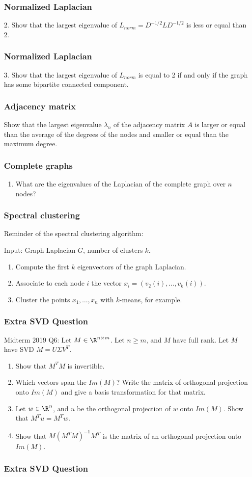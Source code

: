 \documentclass{beamer}
\begin{document}
\begin{frame}[t]
\frametitle{Normalized Laplacian}
2. Show that the largest eigenvalue of $L_{norm} = D^{-1/2} L D^{-1/2}$ is less or equal than 2.
\pause
\end{frame}

\begin{frame}[t]
\frametitle{Normalized Laplacian}
3. Show that the largest eigenvalue of $L_{norm}$ is equal to 2 if and only if the graph has some bipartite connected component.
\pause
\end{frame}

\begin{frame}[t]
\frametitle{Adjacency matrix}
Show that the largest eigenvalue $\lambda_n$ of the adjacency matrix $A$ is larger or equal than the average of the degrees of the nodes and smaller or equal than the maximum degree. 
\pause
\end{frame}

\begin{frame}[t]
\frametitle{Complete graphs}
\begin{enumerate}
\item What are the eigenvalues of the Laplacian of the complete graph over $n$ nodes?
\end{enumerate}
\pause
\end{frame}

\begin{frame}[t]
\frametitle{Spectral clustering}
Reminder of the spectral clustering algorithm:

Input: Graph Laplacian $G$, number of clusters $k$.
\begin{enumerate}
\item Compute the first $k$ eigenvectors of the graph Laplacian.
\item Associate to each node $i$ the vector $x_i = (v_2(i), \dots, v_k(i))$.
\item Cluster the points $x_1, \dots, x_n$ with $k$-means, for example.
\end{enumerate}
\end{frame}

\begin{frame}[t]
\frametitle{Extra SVD Question}
Midterm 2019 Q6: Let $M\in \R^{n\times m}$. Let $n \geq m$, and $M$ have full rank. Let $M$ have SVD $M= U\Sigma V^T$.
\begin{enumerate}
\item Show that $M^TM$ is invertible.
\item Which vectors span the $Im(M)$? Write the matrix of orthogonal projection onto $Im(M)$ and give a basis transformation for that matrix.
\item Let $w\in \R^n$, and $u$ be the orthogonal projection of $w$ onto $Im(M)$. Show that $M^Tu = M^Tw$.
\item Show that $M(M^TM)^{-1} M^T$ is the matrix of an orthogonal projection onto $Im(M)$.
\end{enumerate}
\end{frame}

\begin{frame}[t]
\frametitle{Extra SVD Question}
\pause
\pause
\pause
\pause
\end{frame}

\begin{frame}[t]
\pause
\end{frame}
\end{document}
